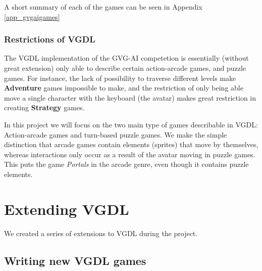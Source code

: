 \documentclass[a4paper,titlepage,final]{report}
\begin{document}
A short summary of each of the games can be seen in Appendix \ref{app_gvgaigames}




\subsection{Restrictions of VGDL}
\label{ssec_gamegenres}
The VGDL implementation of the GVG-AI competetion is essentially (without great extension) only able to describe certain action-arcade games, and puzzle games.
For instance, the lack of possibility to traverse different levels make \textbf{Adventure} games impossible to make, and the restriction of only being able move a single character with the keyboard (the avatar) makes great restriction in creating \textbf{Strategy} games.

In this project we will focus on the two main type of games describable in VGDL: Action-arcade games and turn-based puzzle games. We make the simple distinction that arcade games contain elements (sprites) that move by themselves, whereas interactions only occur as a result of the avatar moving in puzzle games.
This puts the game \emph{Portals} in the arcade genre, even though it contains puzzle elements.










\chapter{Extending VGDL}
\label{ch_extending}

We created a series of extensions to VGDL during the project.



\section{Writing new VGDL games}
\end{document}
